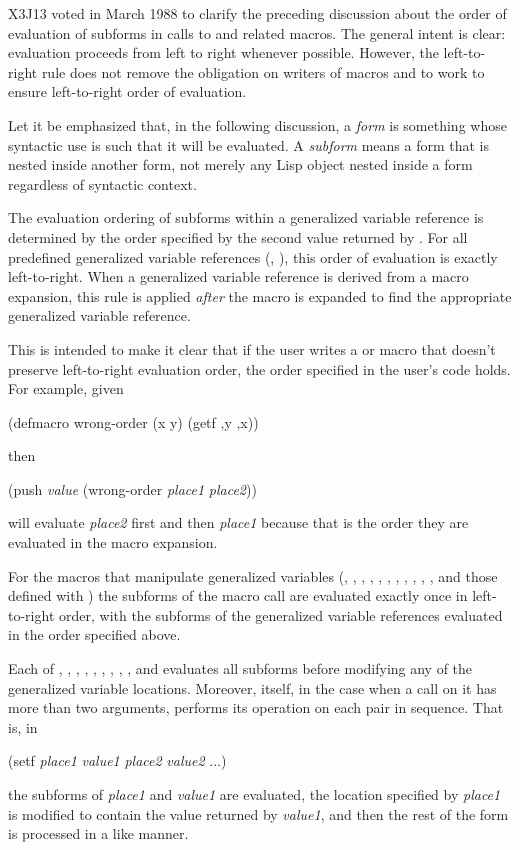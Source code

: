 \begin{newer}
X3J13 voted in March 1988 
to clarify the preceding discussion about the order of evaluation of
subforms in calls to  and related macros.
The general intent is clear: evaluation
proceeds from left to right whenever possible. However, the left-to-right rule does not
remove the obligation on writers of macros and  to work
to ensure left-to-right order of evaluation.

Let it be emphasized that, in the following discussion,
a \emph{form} is something whose syntactic use is such that it will
be evaluated.  A \emph{subform} means a form that is nested inside another form,
not merely any Lisp object nested inside a form regardless of syntactic context. 

The evaluation ordering of subforms within a generalized variable
reference is determined by the order specified by the second value returned by
.  For all predefined generalized variable references
(, ), this order of evaluation is exactly left-to-right.
When a generalized
variable reference is derived from a macro expansion, this rule is applied
\emph{after} the macro is expanded to find the appropriate generalized variable
reference. 

This is intended to make it clear that if the user writes a  or
 macro that doesn't preserve left-to-right
evaluation order, the order specified in the
user's code holds.  For example, given
\begin{lisp}
(defmacro wrong-order (x y) {\Xbq}(getf ,y ,x))
\end{lisp}
then
\begin{lisp}
(push \emph{value} (wrong-order \emph{place1} \emph{place2}))
\end{lisp}
will evaluate \emph{place2} first and then \emph{place1} because that is the order they
are evaluated in the macro expansion.
 
For the macros that manipulate generalized variables (, , ,
, , , , ,
, , , and those defined with
) the subforms of the macro call are evaluated exactly once
in left-to-right order, with the subforms of the generalized variable
references evaluated in the order specified above.

Each of
, , , , , ,
, , , and  evaluates
all subforms before modifying any of the generalized variable locations.  Moreover,
 itself,
in the case when a call on it has more than two arguments, performs its
operation on each pair in sequence.  That is, in
\begin{lisp}
(setf \emph{place1} \emph{value1} \emph{place2} \emph{value2} ...)
\end{lisp}
the subforms of \emph{place1} and \emph{value1} are evaluated, the
location specified by \emph{place1} is modified to contain the value returned by
\emph{value1}, and then the rest of the  form is processed in a like manner.


\end{newer}
